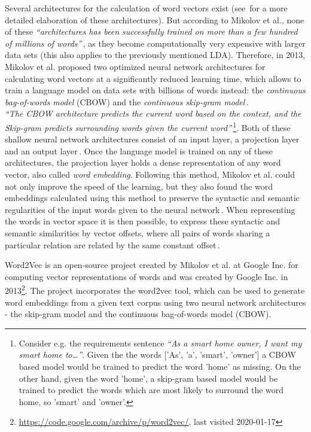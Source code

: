 Several architectures for the calculation of word vectors exist (see\,\cite{mikolov_efficient_2013,mikolov_linguistic_2013} for a more detailed elaboration of these architectures). But according to Mikolov et al., none of these \textit{``architectures has been successfully trained on more than a few hundred of millions of words''}\,\cite[p1]{mikolov_efficient_2013}, as they become computationally very expensive with larger data sets (this also applies to the previously mentioned LDA). Therefore, in 2013, Mikolov et al. proposed two optimized neural network architectures for calculating word vectors at a significantly reduced learning time, which allows to train a language model on data sets with billions of words instead: the \emph{continuous bag-of-words model} (CBOW) and the \emph{continuous skip-gram model}\,\cite{mikolov_efficient_2013}.\\
\textit{``The CBOW architecture predicts the current word based on the context, and the Skip-gram predicts surrounding words given the current word''}\,\cite{mikolov_efficient_2013}\footnote{Consider e.g. the requirements sentence \textit{``As a smart home owner, I want my smart home to\dots''}. Given the the words ['As', 'a', 'smart', 'owner'] a CBOW based model would be trained to predict the word 'home' as missing. On the other hand, given the word 'home', a skip-gram based model would be trained to predict the words which are most likely to surround the word home, so 'smart' and 'owner'.}. Both of these shallow neural network architectures consist of an input layer, a projection layer and an output layer\,\cite{mikolov_efficient_2013,qiang_topic_2016}. Once the language model is trained on any of these architectures, the projection layer holds a dense representation of any word vector, also called \textit{word embedding}. Following this method, Mikolov et al. could not only improve the speed of the learning, but they also found the word embeddings calculated using this method to preserve the syntactic and semantic regularities of the input words given to the neural network\,\cite{mikolov_linguistic_2013}. When representing the words in vector space it is then possible, to express these syntactic and semantic similarities by vector offsets, where all pairs of words sharing a particular relation are related by the same constant offset\,\cite{mikolov_linguistic_2013}.


Word2Vec is an open-source project created by Mikolov et al. at Google Inc. for computing vector representations of words and was created by Google Inc. in 2013\footnote{\label{word2vec_link}\url{https://code.google.com/archive/p/word2vec/}, last visited 2020-01-17}. The project incorporates the word2vec tool, which can be used to generate word embeddings from a given text corpus using two neural network architectures - the skip-gram model and the continuous bag-of-words model (CBOW).


